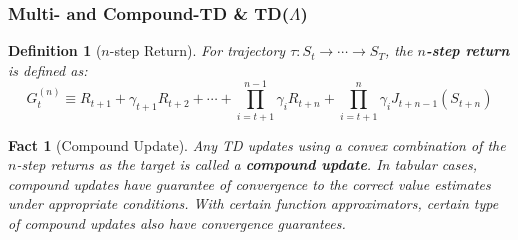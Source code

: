 \documentclass{article}
\newtheorem{fact}{Fact}[section]
\newtheorem{definition}{Definition}[section]
\begin{document}
\subsubsection{Multi- and Compound-TD \& TD($\Lambda$)}
\begin{definition}[$n$-step Return]
For trajectory $\tau: S_t \to \cdots \to S_T$, the \textbf{$n$-step return} is defined as:
$$G_t^{(n)} \equiv R_{t+1} + \gamma_{t+1}R_{t+2} + \cdots + \prod_{i=t+1}^{n-1}{\gamma_{i}}R_{t+n} + \prod_{i=t+1}^{n}{\gamma_{i}}J_{t+n-1}(S_{t+n})$$
\end{definition}
\begin{fact}[Compound Update]
Any TD updates using a convex combination of the $n$-step returns as the target is called a \textbf{compound update}. In tabular cases, compound updates have guarantee of convergence to the correct value estimates under appropriate conditions. With certain function approximators, certain type of compound updates also have convergence guarantees.
\end{fact}
\end{document}
